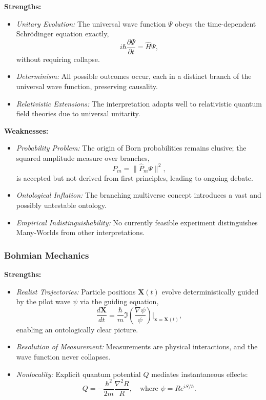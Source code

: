\documentclass[12pt]{article}
\begin{document}
\textbf{Strengths:}
\begin{itemize}
    \item \emph{Unitary Evolution:} The universal wave function $\Psi$ obeys the time-dependent Schrödinger equation exactly,
    \begin{equation}
        i \hbar \frac{\partial \Psi}{\partial t} = \hat{H}\Psi,
        \label{eq:schrodinger}
    \end{equation}
    without requiring collapse.
    \item \emph{Determinism:} All possible outcomes occur, each in a distinct branch of the universal wave function, preserving causality.
    \item \emph{Relativistic Extensions:} The interpretation adapts well to relativistic quantum field theories due to universal unitarity.
\end{itemize}

\textbf{Weaknesses:}
\begin{itemize}
    \item \emph{Probability Problem:} The origin of Born probabilities remains elusive; the squared amplitude measure over branches,
    \begin{equation}
        P_m = \| \hat{P}_m \Psi \|^2,
        \label{eq:branch_prob}
    \end{equation}
    is accepted but not derived from first principles, leading to ongoing debate.
    \item \emph{Ontological Inflation:} The branching multiverse concept introduces a vast and possibly untestable ontology.
    \item \emph{Empirical Indistinguishability:} No currently feasible experiment distinguishes Many-Worlds from other interpretations.
\end{itemize}

\subsubsection*{Bohmian Mechanics}

\textbf{Strengths:}
\begin{itemize}
    \item \emph{Realist Trajectories:} Particle positions $\mathbf{X}(t)$ evolve deterministically guided by the pilot wave $\psi$ via the guiding equation,
    \begin{equation}
        \frac{d\mathbf{X}}{dt} = \frac{\hbar}{m} \Im \left( \frac{\nabla \psi}{\psi} \right) \Big|_{\mathbf{x}=\mathbf{X}(t)},
        \label{eq:guiding_eq}
    \end{equation}
    enabling an ontologically clear picture.
    \item \emph{Resolution of Measurement:} Measurements are physical interactions, and the wave function never collapses.
    \item \emph{Nonlocality:} Explicit quantum potential $Q$ mediates instantaneous effects:
    \begin{equation}
        Q = -\frac{\hbar^2}{2m} \frac{\nabla^2 R}{R}, \quad \text{where } \psi = R e^{iS/\hbar}.
        \label{eq:quantum_potential}
    \end{equation}
\end{itemize}
\end{document}
